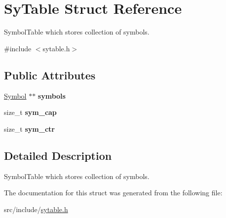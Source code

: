 \hypertarget{struct_sy_table}{}\section{Sy\+Table Struct Reference}
\label{struct_sy_table}


Symbol\+Table which stores collection of symbols.  




{\ttfamily \#include $<$sytable.\+h$>$}

\subsection*{Public Attributes}
\begin{DoxyCompactItemize}
\item 
\mbox{\label{struct_sy_table_adbb4c7791aea1322aca3ed88f8ea58d5}} 
\mbox{\hyperlink{struct_symbol}{Symbol}} $\ast$$\ast$ {\bfseries symbols}
\item 
\mbox{\label{struct_sy_table_af68e1f41c42ac50a21dc844be65b78b2}} 
size\+\_\+t {\bfseries sym\+\_\+cap}
\item 
\mbox{\label{struct_sy_table_a85f9031540dd992aa6b6371537ffebc0}} 
size\+\_\+t {\bfseries sym\+\_\+ctr}
\end{DoxyCompactItemize}


\subsection{Detailed Description}
Symbol\+Table which stores collection of symbols. 

The documentation for this struct was generated from the following file\+:\begin{DoxyCompactItemize}
\item 
src/include/\mbox{\hyperlink{sytable_8h}{sytable.\+h}}\end{DoxyCompactItemize}
